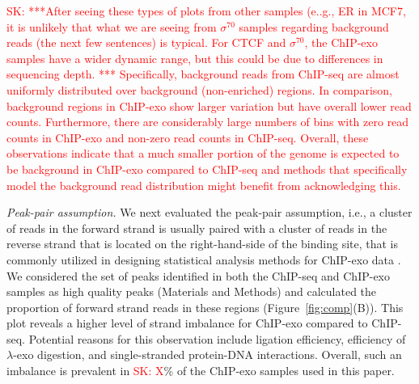 \documentclass{bmcart}
\newcommand{\SK}[1]{\textcolor{red}{SK: #1}}
\newcommand{\sig}{\sigma^{70}}
\begin{document}
\SK{***After seeing these types of plots from other samples (e..g., ER in MCF7, it is unlikely that what we are seeing from $\sig$ samples regarding background reads (the next few sentences) is typical. For CTCF and $\sig$, the ChIP-exo samples have a wider dynamic range, but this could be due to differences in sequencing depth. *** Specifically, background reads from ChIP-seq are  almost
uniformly distributed over background (non-enriched) regions. In comparison, background regions in ChIP-exo show larger variation but have overall lower read counts. Furthermore, there are considerably large numbers of bins with zero read counts in ChIP-exo and non-zero read counts in ChIP-seq.
Overall, these observations indicate that  a much smaller portion of the
genome is expected to be background in ChIP-exo compared to ChIP-seq and 
 methods that
specifically model the background read distribution might benefit from acknowledging this.}

\textit{Peak-pair assumption.} We next evaluated the peak-pair
assumption, i.e., a cluster of reads
in the forward strand is usually paired with a cluster of reads in the
reverse strand that is located on the right-hand-side of  the binding
site, that is commonly utilized in designing statistical analysis methods for ChIP-exo data \cite{mace, cexor, peakzilla}.
We considered the set of peaks identified in both the ChIP-seq and ChIP-exo samples as high quality peaks (Materials and Methods) and calculated the proportion of forward strand reads in these regions (Figure~\ref{fig:comp}(B)). This plot reveals a higher level of strand imbalance for ChIP-exo compared to ChIP-seq. 
Potential reasons for this observation include ligation efficiency, efficiency of $\lambda$-exo digestion, 
and single-stranded protein-DNA interactions. Overall, such an imbalance is prevalent in  \SK{X}\% of the ChIP-exo samples used in this paper.
\end{document}

